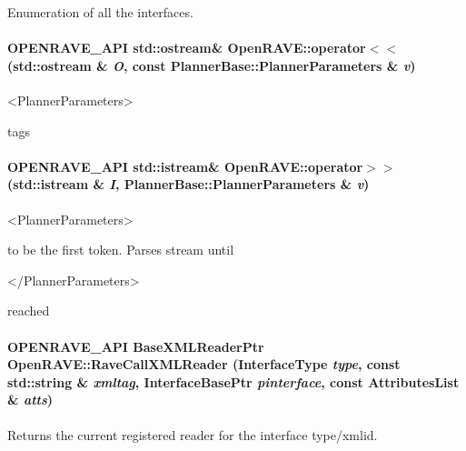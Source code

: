 Enumeration of all the interfaces. \hypertarget{namespaceOpenRAVE_ae99951462c88a655511abbd361bcf841}{
\paragraph[{operator$<$$<$}]{\setlength{\rightskip}{0pt plus 5cm}OPENRAVE\_\-API std::ostream\& OpenRAVE::operator$<$$<$ (std::ostream \& {\em O}, \/  const PlannerBase::PlannerParameters \& {\em v})}\hfill}
\label{namespaceOpenRAVE_ae99951462c88a655511abbd361bcf841}
\begin{DoxyVerb}<PlannerParameters> \end{DoxyVerb}
 tags \hypertarget{namespaceOpenRAVE_a06be8afa87a225a4a6cdc0a5c2de150a}{
\paragraph[{operator$>$$>$}]{\setlength{\rightskip}{0pt plus 5cm}OPENRAVE\_\-API std::istream\& OpenRAVE::operator$>$$>$ (std::istream \& {\em I}, \/  PlannerBase::PlannerParameters \& {\em v})}\hfill}
\label{namespaceOpenRAVE_a06be8afa87a225a4a6cdc0a5c2de150a}
\begin{DoxyVerb}<PlannerParameters> \end{DoxyVerb}
 to be the first token. Parses stream until \begin{DoxyVerb}</PlannerParameters> \end{DoxyVerb}
 reached \hypertarget{namespaceOpenRAVE_ad71eecb48ab2b3d6710feba24618f479}{
\paragraph[{RaveCallXMLReader}]{\setlength{\rightskip}{0pt plus 5cm}OPENRAVE\_\-API BaseXMLReaderPtr OpenRAVE::RaveCallXMLReader (InterfaceType {\em type}, \/  const std::string \& {\em xmltag}, \/  InterfaceBasePtr {\em pinterface}, \/  const AttributesList \& {\em atts})}\hfill}
\label{namespaceOpenRAVE_ad71eecb48ab2b3d6710feba24618f479}


Returns the current registered reader for the interface type/xmlid. 


